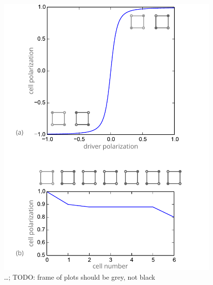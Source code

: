 \begin{figure}
  \center
  \includegraphics{qca_characterization}
  \caption{\ldots; TODO: frame of plots should be grey, not black}
  \label{fig:qca_characterization}
\end{figure}

